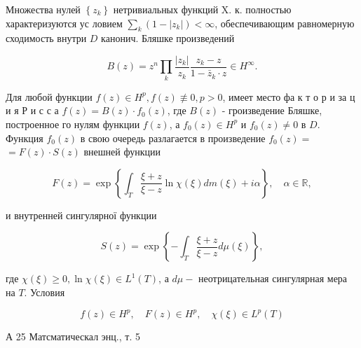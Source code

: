 \documentclass[10pt]{article}
\begin{document}
Множества нулей $\left\{z_{k}\right\}$ нетривиальных функций $\mathrm{X}$. к. полностью характеризуются ус ловием $\sum_{k}\left(1-\left|z_{k}\right|\right)<\infty$, обеспечивающим равномерную сходимость внутри $D$ канонич. Бляшке произведений



\[

B(z)=z^{n} \prod_{k} \frac{\left|z_{k}\right|}{z_{k}} \frac{z_{k}-z}{1-\bar{z}_{k} \cdot z} \in H^{\infty} .

\]



Для любой функции $f(z) \in H^{p}, f(z) \not \equiv 0, p>0$, имеет место фа к т о р и за ц и я Р и с с а $f(z)=B(z) \cdot f_{0}(z)$, где $B(z)$ - гроизведение Бляшке, построенное го нулям функции $f(z)$, а $f_{0}(z) \in H^{p}$ и $f_{0}(z) \neq 0$ в $D$. Функция $f_{0}(z)$ в свою очередь разлагается в произведение $f_{0}(z)=$ $=F(z) \cdot S(z)$ внешней функции



\[

F(z)=\exp \left\{\int_{T} \frac{\xi+z}{\xi-z} \ln \chi(\xi) d m(\xi)+i \alpha\right\}, \quad \alpha \in \mathbb{R},

\]



и внутренней сингулярної функции



\[

S(z)=\exp \left\{-\int_{T} \frac{\xi+z}{\xi-z} d \mu(\xi)\right\},

\]



где $\chi(\xi) \geqslant 0, \ln \chi(\xi) \in L^{1}(T)$, а $d \mu-$ неотрицательная сингулярная мера на $T$. Условия



\[

f(z) \in H^{p}, \quad F(z) \in H^{p}, \quad \chi(\xi) \in L^{p}(T)

\]



А 25 Матсматическал энц., т. 5
\end{document}
